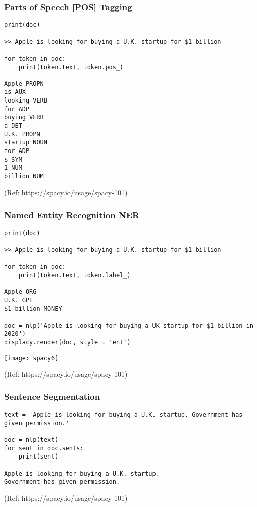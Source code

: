 \begin{frame}[fragile]\frametitle{Parts of Speech [POS] Tagging }

\begin{lstlisting}
print(doc)

>> Apple is looking for buying a U.K. startup for $1 billion

for token in doc:
    print(token.text, token.pos_)

Apple PROPN
is AUX
looking VERB
for ADP
buying VERB
a DET
U.K. PROPN
startup NOUN
for ADP
$ SYM
1 NUM
billion NUM
\end{lstlisting}
	
{\tiny (Ref: https://spacy.io/usage/spacy-101)}
\end{frame}

\begin{frame}[fragile]\frametitle{Named Entity Recognition NER}

\begin{lstlisting}
print(doc)

>> Apple is looking for buying a U.K. startup for $1 billion

for token in doc:
    print(token.text, token.label_)

Apple ORG
U.K. GPE
$1 billion MONEY

doc = nlp('Apple is looking for buying a UK startup for $1 billion in 2020')
displacy.render(doc, style = 'ent')
\end{lstlisting}

\begin{center}
\texttt{[image: spacy6]}
\end{center}

{\tiny (Ref: https://spacy.io/usage/spacy-101)}
\end{frame}

\begin{frame}[fragile]\frametitle{Sentence Segmentation}

\begin{lstlisting}
text = 'Apple is looking for buying a U.K. startup. Government has given permission.'

doc = nlp(text)
for sent in doc.sents:
    print(sent)
		
Apple is looking for buying a U.K. startup.
Government has given permission.
\end{lstlisting}
	
{\tiny (Ref: https://spacy.io/usage/spacy-101)}
\end{frame}

